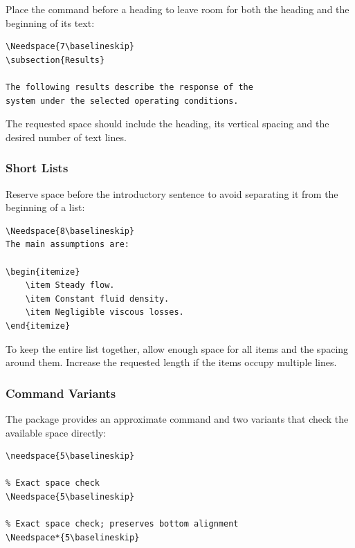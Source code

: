 Place the command before a heading to leave room for both the
heading and the beginning of its text:

\begin{lstlisting}[style=latex]
\Needspace{7\baselineskip}
\subsection{Results}

The following results describe the response of the
system under the selected operating conditions.
\end{lstlisting}

The requested space should include the heading, its vertical
spacing and the desired number of text lines.

\subsubsection{Short Lists}

Reserve space before the introductory sentence to avoid
separating it from the beginning of a list:

\begin{lstlisting}[style=latex]
\Needspace{8\baselineskip}
The main assumptions are:

\begin{itemize}
    \item Steady flow.
    \item Constant fluid density.
    \item Negligible viscous losses.
\end{itemize}
\end{lstlisting}

To keep the entire list together, allow enough space for all
items and the spacing around them. Increase the requested
length if the items occupy multiple lines.

\subsubsection{Command Variants}

The package provides an approximate command and two variants
that check the available space directly:

\begin{lstlisting}[style=latex]
% Approximate space reservation
\needspace{5\baselineskip}

% Exact space check
\Needspace{5\baselineskip}

% Exact space check; preserves bottom alignment
\Needspace*{5\baselineskip}
\end{lstlisting}

